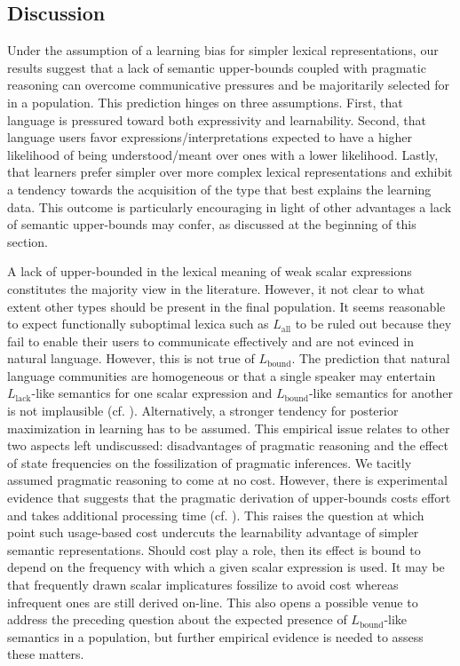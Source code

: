 \documentclass[a4paper]{article}
\newcommand{\mylang}[1]{\ensuremath{L_{\text{#1}}}\xspace} %
\newcommand{\Lall}{\mylang{all}}
\newcommand{\Lbound}{\mylang{bound}}
\newcommand{\Llack}{\mylang{lack}}
\begin{document}
\subsection{Discussion}
Under the assumption of a learning bias for simpler lexical representations, our results suggest that a lack of semantic upper-bounds coupled with pragmatic reasoning can overcome communicative pressures and be majoritarily selected for in a population. This prediction hinges on three assumptions. First, that language is pressured toward both expressivity and learnability. Second, that language users favor expressions/interpretations expected to have a higher likelihood of being understood/meant over ones with a lower likelihood. Lastly, that learners prefer simpler over more complex lexical representations and exhibit a tendency towards the acquisition of the type that best explains the learning data. This outcome is particularly encouraging in light of other advantages a lack of semantic upper-bounds may confer, as discussed at the beginning of this section.

A lack of upper-bounded in the lexical meaning of weak scalar expressions constitutes the majority view in the literature. However, it not clear to what extent other types should be present in the final population. It seems reasonable to expect functionally suboptimal lexica such as $\Lall$ to be ruled out because they fail to enable their users to communicate effectively and are not evinced in natural language. However, this is not true of $\Lbound$. The prediction that natural language communities are homogeneous or that a single speaker may entertain $\Llack$-like semantics for one scalar expression and $\Lbound$-like semantics for another is not implausible (cf. \citealt{franke+degen:2016}). Alternatively, a stronger tendency for posterior maximization in learning has to be assumed. This empirical issue relates to other two aspects left undiscussed: disadvantages of pragmatic reasoning and the effect of state frequencies on the fossilization of pragmatic inferences. We tacitly assumed pragmatic reasoning to come at no cost. However, there is experimental evidence that suggests  that the pragmatic derivation of upper-bounds costs effort and takes additional processing time (cf. \citealt{deNeys+schaeken:2007, huang+snedeker:2009}). This raises the question at which point such usage-based cost undercuts the learnability advantage of simpler semantic representations. Should cost play a role, then its effect is bound to depend on the frequency with which a given scalar expression is used. It may be that frequently drawn scalar implicatures fossilize to avoid cost whereas infrequent ones are still derived on-line. This also opens a possible venue to address the preceding question about the expected presence of $\Lbound$-like semantics in a population, but further empirical evidence is needed to assess these matters.
\end{document}
